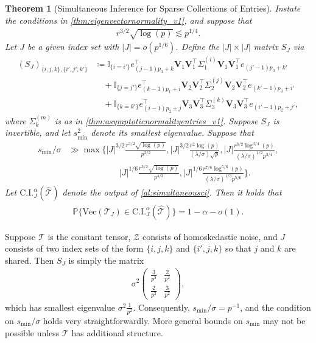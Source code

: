 \documentclass[10pt]{article}
\newcommand{\0}{{\mathbf{0}}}
\newcommand{\1}{{\mathbf{1}}}
\renewcommand{\t}{^{\top}}
\newtheorem{theorem}{Theorem}
\newcommand{\p}{\mathbb{P}}
\newcommand{\inv}{^{-1}}
\renewcommand{\hat}{\widehat}
\renewcommand{\hat}{\widehat}
\begin{document}
\begin{theorem}[Simultaneous Inference for Sparse Collections of Entries] \label{thm:simultaneousinference_v1}
Instate the conditions in \cref{thm:eigenvectornormality_v1}, and suppose that 
\begin{align*}
    r^{3/2} \sqrt{\log(p)} \lesssim p^{1/4}.
\end{align*}
Let $J$ be a given index set with $|J| = o(p^{1/6})$.  Define the $|J|\times |J|$ matrix $S_J$ via
\begin{align*}
    (S_J)_{\{i,j,k\},\{i',j',k'\}} &\coloneqq  \mathbb{I}_{\{i= i'\}} e_{(j-1)p_3 + k}\t  \mathbf{V}_1 \mathbf{V}_1\t \Sigma_1^{(i)} \mathbf{ V}_1 \mathbf{ V}_1\t e_{(j'-1)p_3 + k'} \\
    &\quad + \mathbb{I}_{\{j= j'\}} e_{(k-1)p_1 + i}\t  \mathbf{ V}_2 \mathbf{ V}_2\t \Sigma_2^{(j)} \mathbf{ V}_2 \mathbf{ V}_2\t e_{(k'-1)p_3 + i'}  \\
    &\quad + \mathbb{I}_{\{k= k'\}} e_{(i-1)p_2 + j}\t  \mathbf{ V}_3 \mathbf{ V}_3\t \Sigma_3^{(k)} \mathbf{ V}_3 \mathbf{ V}_3\t e_{(i'-1)p_2 + j'},
\end{align*}
where $\Sigma_k^{(m)}$ is as in \cref{thm:asymptoticnormalityentries_v1}.  Suppose $S_J$ is invertible, and let $s^2_{\min}$ denote its smallest eigenvalue.  Suppose that 
\begin{align*}
    s_{\min}/\sigma &\gg \max\bigg\{ |J|^{3/2}  \frac{r^{3/2} \sqrt{\log(p)}}{p^{3/2}}, |J|^{3/2} \frac{ r^2 \log(p)}{(\lambda/\sigma) \sqrt{p}}, |J| \frac{  r^{3/2}  \log^{3/4}(p)}{(\lambda/\sigma)^{1/2} p^{3/4}}, \\
      &\qquad \qquad \qquad  |J|^{1/6} \frac{ r^{3/2} \sqrt{\log(p)}}{p^{4/3}}, |J|^{1/6} \frac{r^{7/6} \log^{5/6}(p)}{(\lambda/\sigma)^{1/3} p^{5/6}}\bigg\}.
\end{align*}
Let $\mathrm{C.I.}_J^{\alpha}(\mathcal{\hat T})$ denote the output of \cref{al:simultaneousci}.  Then it holds that
\begin{align*}
 \p\bigg\{ \mathrm{Vec}(\mathcal{ T}_J) \in  \mathrm{C.I.}^{\alpha}_{J}(\mathcal{\hat T}) \bigg\} = 1- \alpha - o(1).
\end{align*}
\end{theorem}

Suppose $\mathcal{T}$ is the constant tensor, $\mathcal{Z}$ consists of homoskedastic noise, and $J$ consists of two index sets of the form $\{i,j,k\}$ and $\{i',j,k\}$ so that $j$ and $k$ are shared. Then $S_J$ is simply the matrix
\begin{align*}
    \sigma^2 \begin{pmatrix} \frac{3}{p^2} & \frac{2}{p^2} \\ \frac{2}{p^2} & \frac{3}{p^2} \end{pmatrix},
\end{align*}
which has smallest eigenvalue $\sigma^2\frac{1}{p^2}$.  Consequently,  $s_{\min}/\sigma = p\inv$, and the condition on $s_{\min}/\sigma$ holds very straightforwardly.  More general bounds on $s_{\min}$ may not be possible unless $\mathcal{T}$ has additional structure.  
\end{document}
